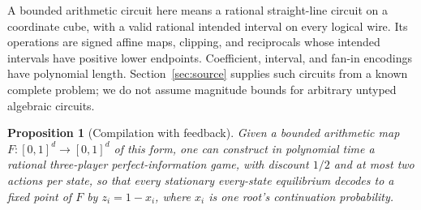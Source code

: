 \documentclass[11pt,a4paper]{article}
\numberwithin{equation}{section}
\newtheorem{proposition}[theorem]{Proposition}
\theoremstyle{definition}
\begin{document}
A bounded arithmetic circuit here means a rational straight-line circuit
on a coordinate cube, with a valid rational intended interval on every
logical wire. Its operations are signed affine maps, clipping, and
reciprocals whose intended intervals have positive lower endpoints.
Coefficient, interval, and fan-in encodings have polynomial length.
Section~\ref{sec:source} supplies such circuits from a known complete
problem; we do not assume magnitude bounds for arbitrary untyped
algebraic circuits.

\begin{proposition}[Compilation with feedback]\label{prop:compiler}
Given a bounded arithmetic map \(F:[0,1]^d\to[0,1]^d\) of this form,
one can construct in polynomial time a rational three-player
perfect-information game, with discount \(1/2\) and at most two actions
per state, so that every stationary every-state equilibrium decodes to
a fixed point of \(F\) by \(z_i=1-x_i\), where \(x_i\) is one root's
continuation probability.
\end{proposition}
\end{document}
